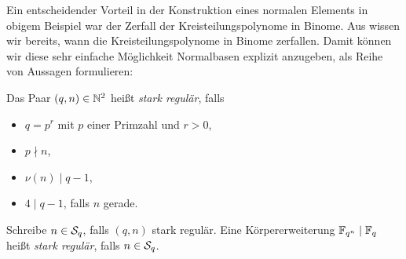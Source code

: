 Ein entscheidender Vorteil in der Konstruktion eines normalen Elements in
obigem Beispiel war der Zerfall der Kreisteilungspolynome in Binome. Aus 
wissen wir bereits, wann die Kreisteilungspolynome in Binome zerfallen.
Damit können wir diese sehr einfache Möglichkeit Normalbasen explizit anzugeben,
als Reihe von Aussagen formulieren:

\begin{definition}
  \label{def:stark_regular}
  Das Paar $(q,n) \in \N^2$ heißt \emph{stark regulär}, falls
  \begin{itemize}
    \item $q = p^r$ mit $p$ einer Primzahl und $r>0$,
    \item $p \nmid n$,
    \item $\nu(n) \mid q-1$,
    \item $4 \mid q-1$, falls $n$ gerade.
  \end{itemize}
  Schreibe $n \in \S_q$, falls $(q,n)$ stark regulär.
  Eine Körpererweiterung $\F_{q^n} \mid \F_q$ heißt \emph{stark regulär}, falls
  $n \in \S_q$.
\end{definition}


